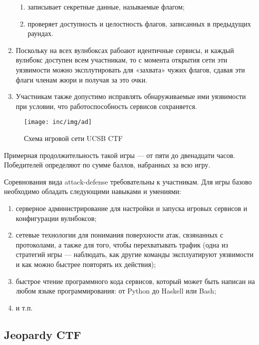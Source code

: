 \begin{enumerate}
\begin{enumerate}
      \item записывает секретные данные, называемые флагом;
      \item проверяет доступность и целостность флагов, записанных в предыдущих раундах.
    \end{enumerate}
  \item Поскольку на всех вулнбоксах рабоают идентичные сервисы, и каждый вулнбокс доступен всем участникам, то с момента открытия сети эти уязвимости можно эксплутировать для «захвата» чужих флагов, сдавая эти флаги членам жюри и получая за это очки.
  \item Участникам также допустимо исправлять обнаруживаемые ими уязвимости при условии, что работоспособность сервисов сохраняется.
\end{enumerate}

\begin{figure}
  \centering
  \texttt{[image: inc/img/ad]}
  \caption{Схема игровой сети UCSB CTF}
  \label{fig:ad}
\end{figure}

Примерная продолжительность такой игры --- от пяти до двенадцати часов. Победителей определяют по сумме баллов, набранных за всю игру.

Соревнования вида attack-defense требовательны к участникам. Для игры базово необходимо обладать следующими навыками и умениями:
\begin{enumerate}
  \item серверное администрирование для настройки и запуска игровых сервисов и конфигурации вулнбоксов;
  \item сетевые технологии для понимания поверхности атак, свзянанных с протоколами, а также для того, чтобы перехватывать трафик (одна из стратегий игры --- наблюдать, как другие команды эксплуатируют уязвимости и как можно быстрее повторять их действия\cite{ReplayAttacks});
  \item быстрое чтение программного кода сервисов, который может быть написан на любом языке программирования: от Python\cite{PythonService} до Haskell\cite{HaskellSerivce} или Bash\cite{BashService};
  \item и т.п.
\end{enumerate}




\subsection{Jeopardy CTF}

